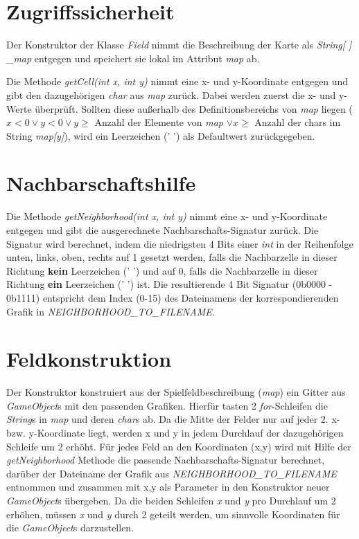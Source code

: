 \documentclass{pi1}
\begin{document}
\section{Zugriffssicherheit}

Der Konstruktor der Klasse \textit{Field} nimmt die Beschreibung der Karte als \textit{String[ ] \_map} entgegen und speichert sie lokal im Attribut \textit{map} ab.

Die Methode \textit{getCell(int x, int y)} nimmt eine x- und y-Koordinate entgegen und gibt den dazugehörigen \textit{char} aus \textit{map} zurück. Dabei werden zuerst die x- und y-Werte überprüft. Sollten diese außerhalb des Definitionsbereichs von \textit{map} liegen ($x<0 \lor y<0 \lor y\geq$ Anzahl der Elemente von \textit{map} $\lor x\geq$ Anzahl der chars im String \textit{map[y]}), wird ein Leerzeichen (' ') als Defaultwert zurückgegeben.
\section{Nachbarschaftshilfe}

Die Methode \textit{getNeighborhood(int x, int y)} nimmt eine x- und y-Koordinate entgegen und gibt die ausgerechnete Nachbarschafts-Signatur zurück. Die Signatur wird berechnet, indem die niedrigsten 4 Bits einer \textit{int} in der Reihenfolge unten, links, oben, rechts auf 1 gesetzt werden, falls die Nachbarzelle in dieser Richtung \textbf{kein} Leerzeichen (' ') und auf 0, falls die Nachbarzelle in dieser Richtung \textbf{ein} Leerzeichen (' ') ist. Die resultierende 4 Bit Signatur (0b0000 - 0b1111) entspricht dem Index (0-15) des Dateinamens der korrespondierenden Grafik in \textit{NEIGHBORHOOD\_TO\_FILENAME}.
\section{Feldkonstruktion}

Der Konstruktor konstruiert aus der Spielfeldbeschreibung (\textit{map}) ein Gitter aus \textit{GameObject}s mit den passenden Grafiken. Hierfür tasten 2 \textit{for}-Schleifen die \textit{String}s in \textit{map} und deren \textit{char}s ab. Da die Mitte der Felder nur auf jeder 2. x- bzw. y-Koordinate liegt, werden x und y in jedem Durchlauf der dazugehörigen Schleife um 2 erhöht. Für jedes Feld an den Koordinaten (x,y) wird mit Hilfe der \textit{getNeighborhood} Methode die passende Nachbarschafts-Signatur berechnet, darüber der Dateiname der Grafik aus \textit{NEIGHBORHOOD\_TO\_FILENAME} entnommen und zusammen mit x,y als Parameter in den Konstruktor neuer \textit{GameObject}s übergeben. Da die beiden Schleifen \textit{x} und \textit{y} pro Durchlauf um 2 erhöhen, müssen \textit{x} und \textit{y} durch 2 geteilt werden, um sinnvolle Koordinaten für die \textit{GameObject}s darzustellen.
\end{document}
